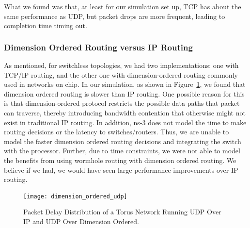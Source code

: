 What we found was that, at least for our simulation set up, TCP has about the same performance as UDP, but packet drops are more frequent, leading to completion time timing out.


\subsubsection{Dimension Ordered Routing versus IP Routing}
As mentioned, for switchless topologies, we had two implementations: one with TCP/IP routing, and the other one with dimension-ordered routing commonly used in networks on chip. In our simulation, as shown in Figure~\ref{fig:dim_ordered}, we found that dimension ordered routing is slower than IP routing. One possible reason for this is that dimension-ordered protocol restricts the possible data paths that packet can traverse, thereby introducing bandwidth contention that otherwise might not exist in traditional IP routing.  In addition, ns-3 does not model the time to make routing decisions or the latency to switches/routers.  Thus, we are unable to model the faster dimension ordered routing decisions and integrating the switch with the processor.  Further, due to time constraints, we were not able to model the benefits from using wormhole routing with dimension ordered routing.  We believe if we had, we would have seen large performance improvements over IP routing.

\captionsetup[subfloat]{captionskip=-0.003in}
\begin{figure}
    \centering
    \texttt{[image: dimension\_ordered\_udp]}
    \vspace{-0.1in}
    \caption{Packet Delay Distribution of a Torus Network Running UDP Over IP and UDP Over Dimension Ordered.}
    \label{fig:dim_ordered}
\end{figure}

